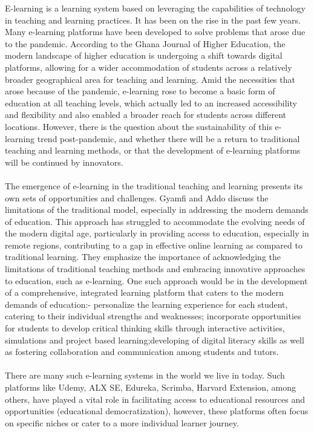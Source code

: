 \documentclass[a4paper,12pt]{article}  %
\begin{document}
E-learning is a learning system based on leveraging the capabilities of
technology in teaching and learning practices. It has been on the rise in the
past few years. Many e-learning platforms have been developed to solve problems
that arose due to the pandemic. According to the Ghana Journal of Higher
Education, the modern landscape of higher education is undergoing a shift
towards digital platforms, allowing for a wider accommodation of students
across a relatively broader geographical area for teaching and learning. Amid
the necessities that arose because of the pandemic, e-learning rose to become a
basic form of education at all teaching levels, which actually led to an
increased accessibility and flexibility and also enabled a broader reach for
students across different locations. However, there is the question about the
sustainability of this e-learning trend post-pandemic, and whether there will
be a return to traditional teaching and learning methods, or that the
development of e-learning platforms will be continued by innovators.\\
\vspace{0.2cm}\\ The emergence of e-learning in the traditional teaching and
learning presents its own sets of opportunities and challenges. Gyamfi and Addo
discuss the limitations of the traditional model, especially in addressing the
modern demands of education.\cite{gyamfi2020stakeholders} This approach has
struggled to accommodate the evolving needs of the modern digital age,
particularly in providing access to education, especially in remote regions,
contributing to a gap in effective online learning as compared to traditional
learning. They emphasize the importance of acknowledging the limitations of
traditional teaching methods and embracing innovative approaches to education,
such as e-learning. One such approach would be in the development of a
comprehensive, integrated learning platform that caters to the modern demands
of education:- personalize the learning experience for each student, catering
to their individual strengths and weaknesses; incorporate opportunities for
students to develop critical thinking skills through interactive activities,
simulations and project based learning;developing of digital literacy skills as
well as fostering collaboration and communication among students and tutors.\\
\vspace{0.2cm}\\ There are many such e-learning systems in the world we live in
today. Such platforms like Udemy, ALX SE, Edureka, Scrimba, Harvard Extension,
among others, have played a vital role in facilitating access to educational
resources and opportunities (educational democratization), however, these
platforms often focus on specific niches or cater to a more individual learner
journey.
\end{document}
